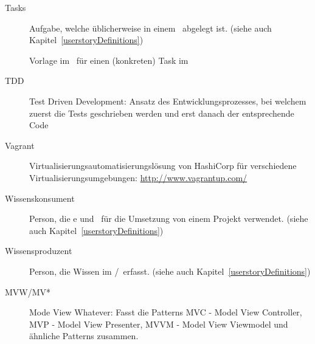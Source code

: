 \begin{description}
		\item[Tasks]{Aufgabe, welche üblicherweise in einem \ppt\ abgelegt ist. (siehe auch Kapitel~\ref{userstoryDefinitions})}
		\item[\ttpl]{Vorlage im \eeppi\ für einen (konkreten) Task im \ppt}
		\item[TDD]{Test Driven Development: Ansatz des Entwicklungsprozesses, bei welchem zuerst die Tests geschrieben werden und erst danach der entsprechende Code}
		\item[Vagrant]{Virtualisierungsautomatisierungslösung von HashiCorp für verschiedene Virtualisierungsumgebungen: \url{http://www.vagrantup.com/}}
		\item[Wissenskonsument]{Person, die \dks e und \eeppi\ für die Umsetzung von einem Projekt verwendet. (siehe auch Kapitel~\ref{userstoryDefinitions})}
		\item[Wissensproduzent]{Person, die Wissen im \dks/\eeppi\ erfasst. (siehe auch Kapitel~\ref{userstoryDefinitions})}
		\item[MVW/MV*] Mode View Whatever: Fasst die Patterns MVC - Model View Controller, MVP - Model View Presenter, MVVM - Model View Viewmodel und ähnliche Patterns zusammen.
	\end{description}